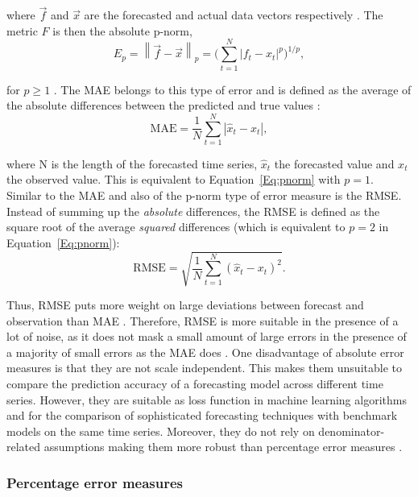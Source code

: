\noindent where $\vec{f}$ and $\vec{x}$ are the forecasted and actual data vectors respectively \citep{Haben:2014}. The metric $F$ is then the absolute p-norm,
%
\begin{equation} \label{Eq:pnorm}
    E_p=\left\lVert\vec{f}-\vec{x}\right\rVert_p=\biggl(\sum_{t=1}^N \left|f_t-x_t\right|^p\biggr)^{1/p},
\end{equation}

\noindent for $p\geq1$ \citep[][p. 52]{golub:2012}. The MAE belongs to this type of error and is defined as the average of the absolute differences between the predicted and true values \citep{Hoff:2013}:
%
\begin{equation} \label{Eq:MAE}
\text{MAE}=\frac{1}{N}\sum_{t=1}^N\left|\widehat{x}_t-x_t\right|,    
\end{equation}

\noindent where N is the length of the forecasted time series, $\widehat{x}_t$ the forecasted value and $x_t$ the observed value. This is equivalent to Equation~\ref{Eq:pnorm} with $p=1$. Similar to the MAE and also of the p-norm type of error measure is the RMSE. Instead of summing up the \textit{absolute} differences, the RMSE is defined as the square root of the average \textit{squared} differences (which is equivalent to $p=2$ in Equation~\ref{Eq:pnorm}):
%
\begin{equation} \label{Eq:RMSE}
\text{RMSE}=\sqrt{\frac{1}{N}\sum_{t=1}^N\left(\widehat{x}_t-x_t\right)^2}.
\end{equation}

\noindent Thus, RMSE puts more weight on large deviations between forecast and observation than MAE \citep{Meer:2018}. Therefore, RMSE is more suitable in the presence of a lot of noise, as it does not mask a small amount of large errors in the presence of a majority of small errors as the MAE does \citep{Zhang:2015}. One disadvantage of absolute error measures is that they are not scale independent. This makes them unsuitable to compare the prediction accuracy of a forecasting model across different time series. However, they are suitable as loss function in machine learning algorithms and for the comparison of sophisticated forecasting techniques with benchmark models on the same time series. Moreover, they do not rely on denominator-related assumptions making them more robust than percentage error measures \citep{Hoff:2013}.


\subsubsection{Percentage error measures}


